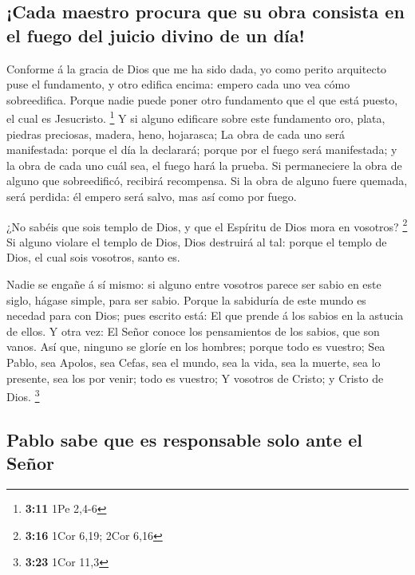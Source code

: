 \hypertarget{cada-maestro-procura-que-su-obra-consista-en-el-fuego-del-juicio-divino-de-un-duxeda}{%
\subsection{¡Cada maestro procura que su obra consista en el fuego del
juicio divino de un
día!}\label{cada-maestro-procura-que-su-obra-consista-en-el-fuego-del-juicio-divino-de-un-duxeda}}

 Conforme á la gracia de Dios que me ha sido dada, yo
como perito arquitecto puse el fundamento, y otro edifica encima: empero
cada uno vea cómo sobreedifica.  Porque nadie puede poner
otro fundamento que el que está puesto, el cual es Jesucristo.
\footnote{\textbf{3:11} 1Pe 2,4-6}  Y si alguno edificare
sobre este fundamento oro, plata, piedras preciosas, madera, heno,
hojarasca;  La obra de cada uno será manifestada: porque
el día la declarará; porque por el fuego será manifestada; y la obra de
cada uno cuál sea, el fuego hará la prueba.  Si
permaneciere la obra de alguno que sobreedificó, recibirá recompensa.
 Si la obra de alguno fuere quemada, será perdida: él
empero será salvo, mas así como por fuego.

 ¿No sabéis que sois templo de Dios, y que el Espíritu de
Dios mora en vosotros? \footnote{\textbf{3:16} 1Cor 6,19; 2Cor 6,16}
 Si alguno violare el templo de Dios, Dios destruirá al
tal: porque el templo de Dios, el cual sois vosotros, santo es.

 Nadie se engañe á sí mismo: si alguno entre vosotros
parece ser sabio en este siglo, hágase simple, para ser sabio.
 Porque la sabiduría de este mundo es necedad para con
Dios; pues escrito está: El que prende á los sabios en la astucia de
ellos.  Y otra vez: El Señor conoce los pensamientos de
los sabios, que son vanos.  Así que, ninguno se gloríe en
los hombres; porque todo es vuestro;  Sea Pablo, sea
Apolos, sea Cefas, sea el mundo, sea la vida, sea la muerte, sea lo
presente, sea los por venir; todo es vuestro;  Y vosotros
de Cristo; y Cristo de Dios. \footnote{\textbf{3:23} 1Cor 11,3}

\hypertarget{pablo-sabe-que-es-responsable-solo-ante-el-seuxf1or}{%
\subsection{Pablo sabe que es responsable solo ante el
Señor}\label{pablo-sabe-que-es-responsable-solo-ante-el-seuxf1or}}

